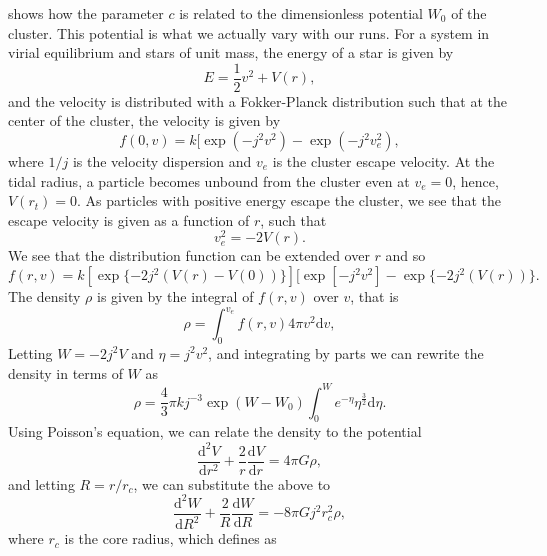 \documentclass{princeton_astro_thesis}
\numberwithin{equation}{section}
\begin{document}
 \citet{1966King} shows how the parameter $c$ is related to the dimensionless potential $W_{0}$ of the cluster.  This potential is what we actually vary with our runs. For a system in virial equilibrium and stars of unit mass, the energy of a star is given by
\begin{equation}
    E = \frac{1}{2}v^2 + V(r),
\end{equation}
and the velocity is distributed with a Fokker-Planck distribution such that at the center of the cluster, the velocity is given by
\begin{equation}
    f(0,v) = k [\exp(-j^2v^2) - \exp(-j^2v^{2}_{e}),
\end{equation}
where $1/j$ is the velocity dispersion and $v_{e}$ is the cluster escape velocity.  At the tidal radius, a particle becomes unbound from the cluster even at $v_{e} = 0$, hence, $V(r_{t}) = 0$.  As particles with positive energy escape the cluster, we see that the escape velocity is given as a function of $r$, such that
\begin{equation}
v_{e}^{2} = -2V(r).
\end{equation}
We see that the distribution function can be extended over $r$ and so
\begin{equation}
    f(r, v) = k[\exp\{-2j^2(V(r)-V(0))\}][\exp[-j^2v^2] - \exp\{-2j^2(V(r))\}.
\end{equation}
The density $\rho$ is given by the integral of $f(r,v)$ over $v$, that is
\begin{equation}
    \rho = \int_{0}^{v_{e}} f(r,v) 4 \pi v^2 \mathrm{d}v,
    \label{eqn:kingrho}
\end{equation}
Letting $W = -2j^2V$ and $\eta = j^2v^2$, and integrating by parts we can rewrite the density in terms of $W$ as
\begin{equation}
\rho = \frac{4}{3}\pi k j^{-3} \exp(W-W_{0}) \int_{0}^{W} e^{-\eta} \eta^\frac{3}{2} \mathrm{d}\eta.
\end{equation}
Using Poisson's equation, we can relate the density to the potential
\begin{equation}
\frac{\mathrm{d}^2V}{\mathrm{d}r^2} + \frac{2}{r}\frac{\mathrm{d}V}{\mathrm{d}r} = 4 \pi G \rho,
\end{equation}
and letting $R = r/r_c$, we can substitute the above to
\begin{equation}
\frac{\mathrm{d}^2W}{\mathrm{d}R^2} + \frac{2}{R}\frac{\mathrm{d}W}{\mathrm{d}R} = -8 \pi G j^2 r_{c}^2 \rho,
\label{eqn:kingpoisson}
\end{equation}
where $r_{c}$ is the core radius, which \citet{1966King} defines as
\end{document}
